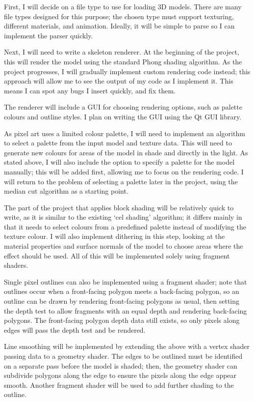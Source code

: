 \documentclass[12pt]{article}
\begin{document}
First, I will decide on a file type to use for loading 3D models. There are many file types designed for this purpose; the chosen type must support texturing, different materials, and animation. Ideally, it will be simple to parse so I can implement the parser quickly.

Next, I will need to write a skeleton renderer. At the beginning of the project, this will render the model using the standard Phong shading algorithm. As the project progresses, I will gradually implement custom rendering code instead; this approach will allow me to see the output of my code as I implement it. This means I can spot any bugs I insert quickly, and fix them.

The renderer will include a GUI for choosing rendering options, such as palette colours and outline styles. I plan on writing the GUI using the Qt GUI library.

As pixel art uses a limited colour palette, I will need to implement an algorithm to select a palette from the input model and texture data. This will need to generate new colours for areas of the model in shade and directly in the light. As stated above, I will also include the option to specify a palette for the model manually; this will be added first, allowing me to focus on the rendering code. I will return to the problem of selecting a palette later in the project, using the median cut algorithm as a starting point.

The part of the project that applies block shading will be relatively quick to write, as it is similar to the existing `cel shading' algorithm; it differs mainly in that it needs to select colours from a predefined palette instead of modifying the texture colour. I will also implement dithering in this step, looking at the material properties and surface normals of the model to choose areas where the effect should be used. All of this will be implemented solely using fragment shaders.

Single pixel outlines can also be implemented using a fragment shader; note that outlines occur when a front-facing polygon meets a back-facing polygon, so an outline can be drawn by rendering front-facing polygons as usual, then setting the depth test to allow fragments with an equal depth and rendering back-facing polygons. The front-facing polygon depth data still exists, so only pixels along edges will pass the depth test and be rendered.

Line smoothing will be implemented by extending the above with a vertex shader passing data to a geometry shader. The edges to be outlined must be identified on a separate pass before the model is shaded; then, the geometry shader can subdivide polygons along the edge to ensure the pixels along the edge appear smooth. Another fragment shader will be used to add further shading to the outline.
\end{document}
